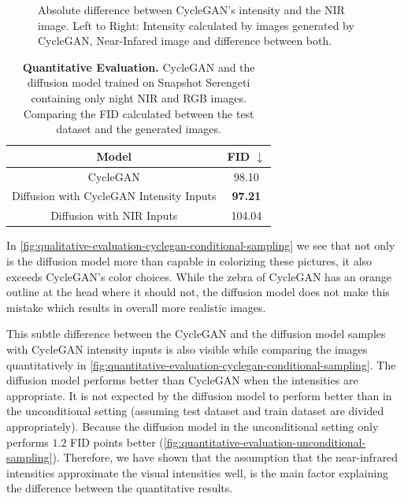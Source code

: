 \begin{figure}[htp!]
\begin{tabularx}{\textwidth}{>{\centering\arraybackslash}X >{\centering\arraybackslash}X >{\centering\arraybackslash}X >{\centering\arraybackslash}X >{\centering\arraybackslash}X >{\centering\arraybackslash}X}
    \end{tabularx}
    \caption{
        Absolute difference between CycleGAN's intensity and the NIR image.
        Left to Right: Intensity calculated by images generated by CycleGAN, Near-Infared image \parencite{serengeti} and difference between both.
    }
    \label{fig:qualitative-evaluation-cyclegan-conditional-sampling}
\end{figure}

\begin{table}[htp!]
    \centering
    \begin{tabular}{c | c}
        Model                                    & FID  $\downarrow$ \\
        \hline\hline
        CycleGAN                                 & 98.10             \\
        Diffusion with CycleGAN Intensity Inputs & \textbf{97.21}    \\
        Diffusion with NIR Inputs                & 104.04
    \end{tabular}
    \caption{
        \textbf{Quantitative Evaluation.} CycleGAN and the diffusion model trained on Snapshot Serengeti \parencite{serengeti} containing only night NIR and RGB images.
        Comparing the FID calculated between the test dataset and the generated images.
    }
    \label{fig:quantitative-evaluation-cyclegan-conditional-sampling}
\end{table}


In \autoref{fig:qualitative-evaluation-cyclegan-conditional-sampling} we see that not only is the diffusion model more than capable in colorizing these pictures,
it also exceeds CycleGAN's color choices. While the zebra of CycleGAN has an orange outline at the head where it should not, the diffusion model does not make this mistake
which results in overall more realistic images.

This subtle difference between the CycleGAN and the diffusion model samples with CycleGAN intensity inputs is also visible while comparing the images quantitatively in \autoref{fig:quantitative-evaluation-cyclegan-conditional-sampling}.
The diffusion model performs better than CycleGAN when the intensities are appropriate.
It is not expected by the diffusion model to perform better than in the unconditional setting (assuming test dataset and train dataset are divided appropriately).
Because the diffusion model in the unconditional setting only performs $1.2$ FID points better (\autoref{fig:quantitative-evaluation-unconditional-sampling}).
Therefore, we have shown that the assumption that the near-infrared intensities approximate the visual intensities well,
is the main factor explaining the difference between the quantitative results.

